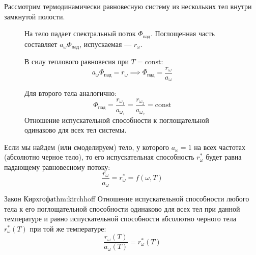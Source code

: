 Рассмотрим термодинамически равновесную систему из нескольких тел внутри замкнутой полости. 

\begin{figure}[H]
	\centering
	\begin{minipage}{0.48\textwidth}
		\centering
		\begin{tcolorbox}[colback=green!5, colframe=green!60!black, title=Тело 1]
			На тело падает спектральный поток $\Phi_{\text{пад}}$. Поглощенная часть составляет $a_\omega \Phi_{\text{пад}}$, испускаемая --- $r_\omega$.
			
			В силу теплового равновесия при $T = \text{const}$:
			\begin{equation*}
				a_\omega \Phi_{\text{пад}} = r_\omega \implies \Phi_{\text{пад}} = \frac{r_\omega}{a_\omega}
			\end{equation*}
		\end{tcolorbox}
	\end{minipage}
	\hfill
	\begin{minipage}{0.48\textwidth}
		\centering
		\begin{tcolorbox}[colback=green!5, colframe=green!60!black, title=Тело 2]
			Для второго тела аналогично:
			\begin{equation*}
				\Phi_{\text{пад}} = \frac{r_{\omega_1}}{a_{\omega_1}} = \frac{r_{\omega_2}}{a_{\omega_2}} = \text{const}
			\end{equation*}
			Отношение испускательной способности к поглощательной одинаково для всех тел системы.
		\end{tcolorbox}
	\end{minipage}
\end{figure}

Если мы найдем (или смоделируем) тело, у которого $a_\omega = 1$ на всех частотах (абсолютно черное тело), то его испускательная способность $r_\omega^*$ будет равна падающему равновесному потоку:
\begin{equation}
	\frac{r_\omega}{a_\omega} = r_\omega^* = f(\omega, T)
\end{equation}

\begin{theorem}{Закон Кирхгофа}{thm:kirchhoff}
	Отношение испускательной способности любого тела к его поглощательной способности одинаково для всех тел при данной температуре и равно испускательной способности абсолютно черного тела $r_\omega^*(T)$ при той же температуре:
	\begin{equation}
		\frac{r_\omega(T)}{a_\omega(T)} = r_\omega^*(T)
	\end{equation}
\end{theorem}


